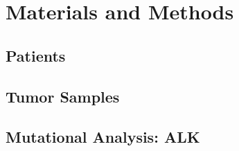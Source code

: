 \chapter{Materials and Methods}

\section{Patients}

\section{Tumor Samples}

\section{Mutational Analysis: ALK}



